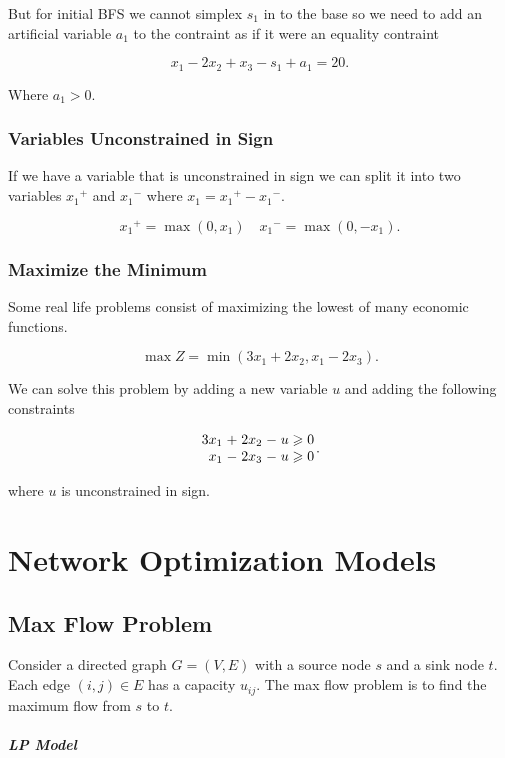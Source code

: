 \documentclass{report}
\begin{document}
But for initial BFS we cannot simplex $s_1$ in to the base so we need to add an artificial variable $a_1$ to the contraint as if it were an equality contraint

\[
	x_1-2x_2+x_3-s_1+a_1=20
	.\]

Where $a_1>0$.

\subsection{Variables Unconstrained in Sign}

If we have a variable that is unconstrained in sign we can split it into two variables ${x_1}^+$ and ${x_1}^-$ where $x_1={x_1}^+-{x_1}^-$.

\[
	{x_1}^+ = \max(0,x_1) \quad {x_1}^- = \max(0,-x_1)
	.\]

\subsection{Maximize the Minimum}

Some real life problems consist of maximizing the lowest of many economic functions.

\[
	\max Z = \min(3x_1+2x_2, x_1-2x_3)
	.\]

We can solve this problem by adding a new variable $u$ and adding the following constraints

\[
	\arraycolsep=1.4pt
	\begin{array}{rrrrrrr}
		3x_1 & + & 2x_2 & - & u & \geq & 0 \\
		x_1  & - & 2x_3 & - & u & \geq & 0
	\end{array}
	.\]

where $u$ is unconstrained in sign.

\chapter{Network Optimization Models}

\section{Max Flow Problem}

Consider a directed graph $G=(V,E)$ with a source node $s$ and a sink node $t$. Each edge $(i,j)\in E$ has a capacity $u_{ij}$. The max flow problem is to find the maximum flow from $s$ to $t$.

\paragraph{LP Model}
\end{document}
